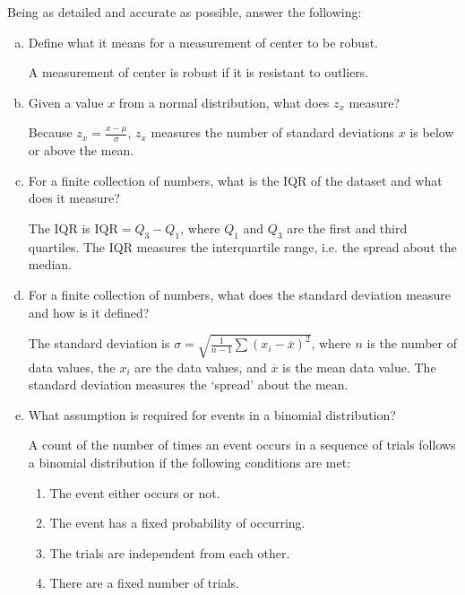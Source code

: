 \documentclass[12pt,letterpaper]{exam}
\begin{document}
\begin{questions}
\newpage
\question[10] Being as detailed and accurate as possible, answer the following:
	\begin{enumerate}[(a)]
	\item Define what it means for a measurement of center to be robust. \pvspace{1.45cm}
	
	A measurement of center is robust if it is resistant to outliers. \pvspace{1.45cm}
	
	\item Given a value $x$ from a normal distribution, what does $z_x$ measure? \pvspace{1.22cm}
	
	Because $z_x= \frac{x - \mu}{\sigma}$, $z_x$ measures the number of standard deviations $x$ is below or above the mean. \pvspace{1.22cm}
	
	\item For a finite collection of numbers, what is the IQR of the dataset and what does it measure? \pvspace{1.25cm}
	
	The IQR is $\text{IQR}= Q_3 - Q_1$, where $Q_1$ and $Q_3$ are the first and third quartiles. The IQR measures the interquartile range, i.e. the spread about the median. \pvspace{1.25cm}
	
	\item For a finite collection of numbers, what does the standard deviation measure and how is it defined? \pvspace{0.9cm}
	
	The standard deviation is $\sigma= \sqrt{\frac{1}{n - 1} \sum (x_i - \overline{x})^2}$, where $n$ is the number of data values, the $x_i$ are the data values, and $\overline{x}$ is the mean data value. The standard deviation measures the `spread' about the mean. \pvspace{0.9cm}
	
	\item What assumption is required for events in a binomial distribution? \pvspace{0.6cm}
	
	A count of the number of times an event occurs in a sequence of trials follows a binomial distribution if the following conditions are met:
		\begin{enumerate}[1.]
		\item The event either occurs or not.
		\item The event has a fixed probability of occurring.
		\item The trials are independent from each other. 
		\item There are a fixed number of trials. 
		\end{enumerate}
	\end{enumerate} 




\end{questions}
\end{document}
